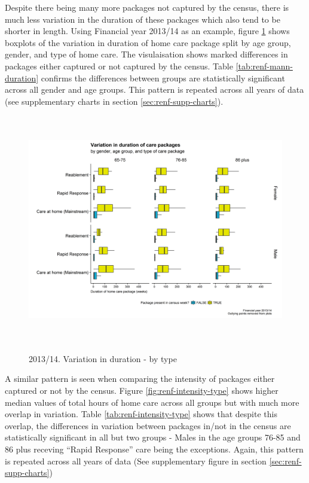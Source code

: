 \documentclass[]{article}
\begin{document}
Despite there being many more packages not captured by the census, there
is much less variation in the duration of these packages which also tend
to be shorter in length. Using Financial year 2013/14 as an example,
figure \ref{fig:renf-duration-type} shows boxplots of the variation in
duration of home care package split by age group, gender, and type of
home care. The visulaisation shows marked differences in packages either
captured or not captured by the census. Table
\ref{tab:renf-mann-duration} confirms the differences between groups are
statistically significant across all gender and age groups. This pattern
is repeated across all years of data (see supplementary charts in
section \ref{sec:renf-supp-charts}).

\begin{figure}[h]
  \centering
    \caption{2013/14. Variation in duration - by type}
    \includegraphics[height = 10cm, width = 12cm]{figures/chapter-renf/08-duration-type.png}
    \label{fig:renf-duration-type}
\end{figure}\newpage

A similar pattern is seen when comparing the intensity of packages
either captured or not by the census. Figure
\ref{fig:renf-intensity-type} shows higher median values of total hours
of home care across all groups but with much more overlap in variation.
Table \ref{tab:renf-intensity-type} shows that despite this overlap, the
differences in variation between packages in/not in the census are
statistically significant in all but two groups - Males in the age
groups 76-85 and 86 plus receving ``Rapid Response'' care being the
exceptions. Again, this pattern is repeated across all years of data
(See supplementary figure in section \ref{sec:renf-supp-charts})
\end{document}

